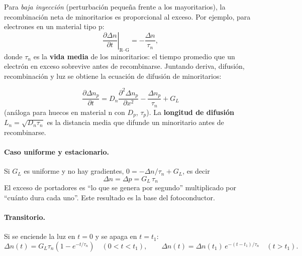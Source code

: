 Para \emph{baja inyección} (perturbación pequeña frente a los mayoritarios), la
recombinación neta de minoritarios es proporcional al exceso. Por ejemplo, para
electrones en un material tipo p:
\[
  \left.\frac{\partial \Delta n}{\partial t}\right|_{\text{R--G}} = -\frac{\Delta n}{\tau_n},
\]
donde $\tau_n$ es la \textbf{vida media} de los minoritarios: el tiempo promedio que un
electrón en exceso sobrevive antes de recombinarse. Juntando deriva, difusión,
recombinación y luz se obtiene la ecuación de difusión de minoritarios:

\begin{clave}
\[
  \frac{\partial \Delta n_p}{\partial t}
  = D_n\frac{\partial^2 \Delta n_p}{\partial x^2}
  - \frac{\Delta n_p}{\tau_n}
  + G_L
\]
(análoga para huecos en material n con $D_p$, $\tau_p$).
La \textbf{longitud de difusión} $L_n=\sqrt{D_n\tau_n}$ es la distancia media que difunde
un minoritario antes de recombinarse.
\end{clave}

\paragraph{Caso uniforme y estacionario.} Si $G_L$ es uniforme y no hay gradientes,
$0 = -\Delta n/\tau_n + G_L$, es decir
\begin{equation}
  \boxed{\Delta n = \Delta p = G_L\,\tau_n}
  \label{eq:dn-estacionario}
\end{equation}
El exceso de portadores es ``lo que se genera por segundo'' multiplicado por ``cuánto
dura cada uno''. Este resultado es la base del fotoconductor.

\paragraph{Transitorio.} Si se enciende la luz en $t=0$ y se apaga en $t=t_1$:
\[
  \Delta n(t) = G_L\tau_n\left(1-e^{-t/\tau_n}\right)\quad(0<t<t_1),
  \qquad
  \Delta n(t) = \Delta n(t_1)\,e^{-(t-t_1)/\tau_n}\quad(t>t_1).
\]

